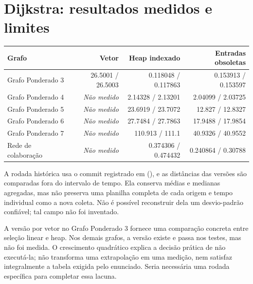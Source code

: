 \documentclass[a4paper,12pt]{article}
\newcommand{\cod}[1]{\texttt{\detokenize{#1}}}
\begin{document}
\section{Dijkstra: resultados medidos e limites}
\par\smallskip\noindent\begin{minipage}{\textwidth}\centering
\begingroup\fontsize{8.6}{11}\selectfont
\setlength{\tabcolsep}{4pt}
\begin{tabular}{lrrr}
\toprule
Grafo & Vetor & Heap indexado & Entradas obsoletas \\
\midrule
Grafo Ponderado 3 & \num{26.5001} / \num{26.5003} & \num{0.118048} / \num{0.117863} & \num{0.153913} / \num{0.153597} \\
Grafo Ponderado 4 & \textit{Não medido} & \num{2.14328} / \num{2.13201} & \num{2.04099} / \num{2.03725} \\
Grafo Ponderado 5 & \textit{Não medido} & \num{23.6919} / \num{23.7072} & \num{12.827} / \num{12.8327} \\
Grafo Ponderado 6 & \textit{Não medido} & \num{27.7484} / \num{27.7863} & \num{17.9488} / \num{17.9854} \\
Grafo Ponderado 7 & \textit{Não medido} & \num{110.913} / \num{111.1} & \num{40.9326} / \num{40.9552} \\
Rede de colaboração & \textit{Não medido} & \num{0.374306} / \num{0.474432} & \num{0.240864} / \num{0.30788} \\
\bottomrule
\end{tabular}
\endgroup
{}
\end{minipage}\par\smallskip

A rodada histórica usa o commit registrado em  (\cod{b414456}), e as distâncias das versões são comparadas fora do intervalo de tempo. Ela conserva médias e medianas agregadas, mas não preserva uma planilha completa de cada origem e tempo individual como a nova coleta. Não é possível reconstruir dela um desvio-padrão confiável; tal campo não foi inventado.

A versão por vetor no Grafo Ponderado 3 fornece uma comparação concreta entre seleção linear e heap. Nos demais grafos, a versão existe e passa nos testes, mas não foi medida. O crescimento quadrático explica a decisão prática de não executá-la; não transforma uma extrapolação em uma medição, nem satisfaz integralmente a tabela exigida pelo enunciado. Seria necessária uma rodada específica para completar essa lacuna.
\end{document}
